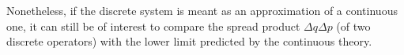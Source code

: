 Nonetheless, if the discrete system is meant as an approximation of a continuous
one, %
it can still be of interest to compare the spread product $\Delta{q}\Delta{p}$
(of two discrete operators)
with the lower limit predicted by the continuous theory.





